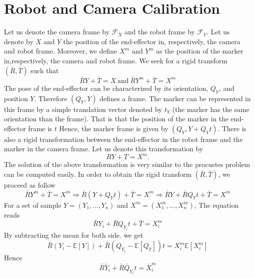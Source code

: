 \documentclass[11pt,a4paper]{article}
\begin{document}
\section{Robot and Camera Calibration}
Let us denote the camera frame by $\mathcal{F}_X$ and the robot frame by $\mathcal{F}_Y$. Let us denote by $X$ and $Y$ the position of the end-effector in, respectively, the camera and robot frame. Moreover, we define $X^m$ and $Y^m$ as the position of the marker in,respectively, the camera and robot frame. We seek for a rigid transform $(\bar{R},\bar{T})$ such that
\begin{equation}
\bar{R}Y + \bar{T} = X ~\text{and}~\bar{R}Y^m + \bar{T} = X^m
\end{equation}
The pose of the end-effector can be characterized by its orientation, $Q_Y$, and position $Y$. Therefore $(Q_Y,Y)$ defines a frame. The marker can be represented in this frame by a simple translation vector denoted by $t_Y$ (the marker has the same orientation than the frame). That is that the position of the marker in the end-effector frame is $t$ Hence, the marker frame is given by $(Q_Y,Y+Q_Yt)$. There is also a rigid transformation between the end-effector in the robot frame and the marker in the camera frame. Let us denote this transformation by 
\begin{equation}
R Y + T = X^m.
\end{equation}
The solution of the above transformation is very similar to the procustes problem can be computed easily. In order to obtain the rigid transform $(\bar{R},\bar{T})$, we proceed as follow
\begin{equation}
\bar{R}Y^m + \bar{T} = X^m \Rightarrow \bar{R}(Y+Q_Yt) + \bar{T} = X^m \Rightarrow \bar{R}Y+ \bar{R}Q_Yt + \bar{T} = X^m 
\end{equation}
For a set of sample $Y = (Y_1,...,Y_n)$ and $X^m = (X^m_1,...,X^m_n)$, The equation reads
\begin{equation}
\bar{R}Y_i+ \bar{R}Q_{Y_i}t + \bar{T} = X^m_i
\end{equation}
By subtracting the mean for both side. we get
\begin{equation}
\bar{R}(Y_i-\mathbb{E}[Y])+ \bar{R}(Q_{Y_i}-\mathbb{E}[Q_Y])t= X^m_i \mathbb{E}[X^m_i]
\end{equation}
Hence
\begin{equation}
\bar{R}\bar{Y}_i+ \bar{R}\bar{Q}_{Y_i}t = \bar{X}^m_i
\end{equation}
\end{document}
